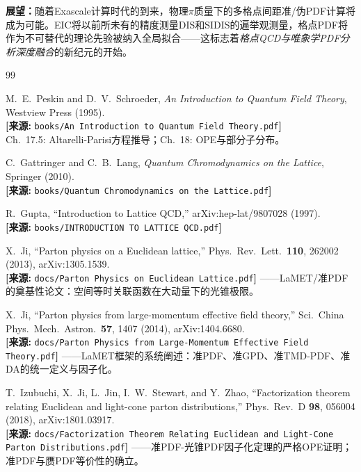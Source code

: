 \documentclass[12pt,a4paper]{ctexart}
\theoremstyle{definition}
\begin{document}
\textbf{展望：}随着Exascale计算时代的到来，物理$\pi$质量下的多格点间距准/伪PDF计算将成为可能。EIC将以前所未有的精度测量DIS和SIDIS的遍举观测量，格点PDF将作为不可替代的理论先验被纳入全局拟合——这标志着\emph{格点QCD与唯象学PDF分析深度融合}的新纪元的开始。

\begin{thebibliography}{99}

M.~E.~Peskin and D.~V.~Schroeder,
\textit{An Introduction to Quantum Field Theory}, Westview Press (1995).
\\\textbf{[来源:} \texttt{books/An Introduction to Quantum Field Theory.pdf}\textbf{]}
\\Ch.~17.5: Altarelli-Parisi方程推导；Ch.~18: OPE与部分子分布。

C.~Gattringer and C.~B.~Lang,
\textit{Quantum Chromodynamics on the Lattice}, Springer (2010).
\\\textbf{[来源:} \texttt{books/Quantum Chromodynamics on the Lattice.pdf}\textbf{]}

R.~Gupta, ``Introduction to Lattice QCD,'' arXiv:hep-lat/9807028 (1997).
\\\textbf{[来源:} \texttt{books/INTRODUCTION TO LATTICE QCD.pdf}\textbf{]}

X.~Ji, ``Parton physics on a Euclidean lattice,''
Phys.\ Rev.\ Lett.\ \textbf{110}, 262002 (2013), arXiv:1305.1539.
\\\textbf{[来源:} \texttt{docs/Parton Physics on Euclidean Lattice.pdf}\textbf{]}
——LaMET/准PDF的奠基性论文：空间等时关联函数在大动量下的光锥极限。

X.~Ji, ``Parton physics from large-momentum effective field theory,''
Sci.\ China Phys.\ Mech.\ Astron.\ \textbf{57}, 1407 (2014), arXiv:1404.6680.
\\\textbf{[来源:} \texttt{docs/Parton Physics from Large-Momentum Effective Field Theory.pdf}\textbf{]}
——LaMET框架的系统阐述：准PDF、准GPD、准TMD-PDF、准DA的统一定义与因子化。

T.~Izubuchi, X.~Ji, L.~Jin, I.~W.~Stewart, and Y.~Zhao,
``Factorization theorem relating Euclidean and light-cone parton distributions,''
Phys.\ Rev.\ D \textbf{98}, 056004 (2018), arXiv:1801.03917.
\\\textbf{[来源:} \texttt{docs/Factorization Theorem Relating Euclidean and Light-Cone Parton Distributions.pdf}\textbf{]}
——准PDF-光锥PDF因子化定理的严格OPE证明；准PDF与赝PDF等价性的确立。


\end{thebibliography}
\end{document}
